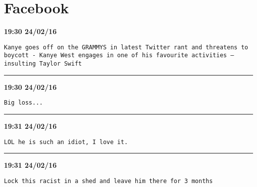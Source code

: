 \section{Facebook}

\begin{adjustwidth}{0cm}{0cm}
\footnotesize \textbf{19:30 24/02/16}

\begin{lstlisting}[breaklines, breakatwhitespace, basicstyle=\small, frame=leftline]
Kanye goes off on the GRAMMYS in latest Twitter rant and threatens to boycott - Kanye West engages in one of his favourite activities – insulting Taylor Swift
\end{lstlisting}
\end{adjustwidth}

\hrule%

\begin{adjustwidth}{0cm}{0cm}
\footnotesize \textbf{19:30 24/02/16}

\begin{lstlisting}[breaklines, breakatwhitespace, basicstyle=\small, frame=leftline]
Big loss...
\end{lstlisting}
\end{adjustwidth}

\hrule%

\begin{adjustwidth}{0cm}{0cm}
\footnotesize \textbf{19:31 24/02/16}

\begin{lstlisting}[breaklines, breakatwhitespace, basicstyle=\small, frame=leftline]
LOL he is such an idiot, I love it.
\end{lstlisting}
\end{adjustwidth}

\hrule%

\begin{adjustwidth}{0cm}{0cm}
\footnotesize \textbf{19:31 24/02/16}

\begin{lstlisting}[breaklines, breakatwhitespace, basicstyle=\small, frame=leftline]
Lock this racist in a shed and leave him there for 3 months
\end{lstlisting}
\end{adjustwidth}

